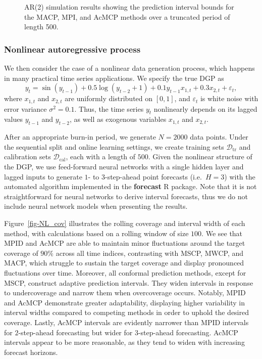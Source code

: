 \documentclass[
  11pt,
  a4paper,
]{article}
\theoremstyle{plain}
\theoremstyle{remark}
\begin{document}
\begin{figure}


\caption{\label{fig-AR2_timeplot}AR(2) simulation results showing the
prediction interval bounds for the MACP, MPI, and AcMCP methods over a
truncated period of length 500.}

\end{figure}%

\subsubsection{Nonlinear autoregressive
process}\label{nonlinear-autoregressive-process}

We then consider the case of a nonlinear data generation process, which
happens in many practical time series applications. We specify the true
DGP as \[
y_t = \sin(y_{t-1}) + 0.5\log(y_{t-2} + 1) + 0.1y_{t-1}x_{1,t} + 0.3x_{2,t} + \varepsilon_{t},
\] where \(x_{1,t}\) and \(x_{2,t}\) are uniformly distributed on
\([0,1]\), and \(\varepsilon_{t}\) is white noise with error variance
\(\sigma^2 = 0.1\). Thus, the time series \(y_t\) nonlinearly depends on
its lagged values \(y_{t-1}\) and \(y_{t-2}\), as well as exogenous
variables \(x_{1,t}\) and \(x_{2,t}\).

After an appropriate burn-in period, we generate \(N=2000\) data points.
Under the sequential split and online learning settings, we create
training sets \(\mathcal{D}_{\text{tr}}\) and calibration sets
\(\mathcal{D}_{\text{cal}}\), each with a length of \(500\). Given the
nonlinear structure of the DGP, we use feed-forward neural networks with
a single hidden layer and lagged inputs to generate \(1\)- to
\(3\)-step-ahead point forecasts (i.e.~\(H=3\)) with the automated
algorithm implemented in the \textbf{forecast} R package. Note that it
is not straightforward for neural networks to derive interval forecasts,
thus we do not include neural network models when presenting the
results.

Figure~\ref{fig-NL_cov} illustrates the rolling coverage and interval
width of each method, with calculations based on a rolling window of
size \(100\). We see that MPID and AcMCP are able to maintain minor
fluctuations around the target coverage of \(90\%\) across all time
indices, contrasting with MSCP, MWCP, and MACP, which struggle to
sustain the target coverage and display pronounced fluctuations over
time. Moreover, all conformal prediction methods, except for MSCP,
construct adaptive prediction intervals. They widen intervals in
response to undercoverage and narrow them when overcoverage occurs.
Notably, MPID and AcMCP demonstrate greater adaptability, displaying
higher variability in interval widths compared to competing methods in
order to uphold the desired coverage. Lastly, AcMCP intervals are
evidently narrower than MPID intervals for \(2\)-step-ahead forecasting
but wider for \(3\)-step-ahead forecasting. AcMCP intervals appear to be
more reasonable, as they tend to widen with increasing forecast
horizons.
\end{document}
